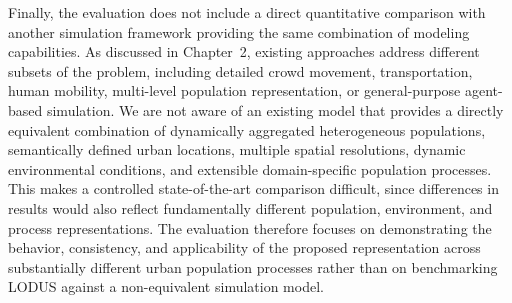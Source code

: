 Finally, the evaluation does not include a direct quantitative comparison with another
simulation framework providing the same combination of modeling capabilities. As
discussed in Chapter~2, existing approaches address different subsets of the problem,
including detailed crowd movement, transportation, human mobility, multi-level
population representation, or general-purpose agent-based simulation. We are not aware
of an existing model that provides a directly equivalent combination of dynamically
aggregated heterogeneous populations, semantically defined urban locations, multiple
spatial resolutions, dynamic environmental conditions, and extensible domain-specific
population processes. This makes a controlled state-of-the-art comparison difficult,
since differences in results would also reflect fundamentally different population,
environment, and process representations. The evaluation therefore focuses on
demonstrating the behavior, consistency, and applicability of the proposed representation
across substantially different urban population processes rather than on benchmarking
LODUS against a non-equivalent simulation model.

